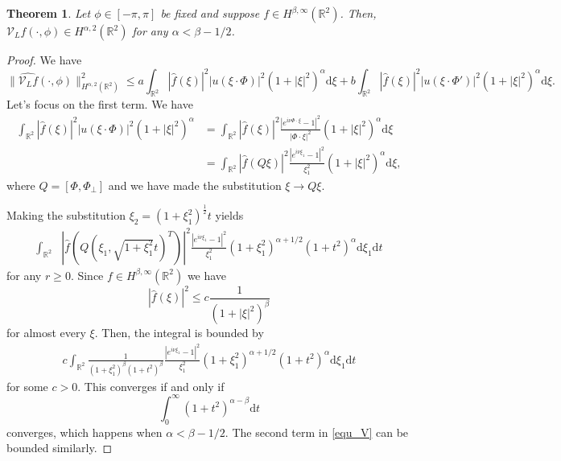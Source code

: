 \documentclass[a4paper,12pt]{amsart}
\numberwithin{equation}{section}
\theoremstyle{plain}
\newtheorem{theorem}{Theorem}
\numberwithin{theorem}{section}
\theoremstyle{definition}
\theoremstyle{remark}
\theoremstyle{remark}
\theoremstyle{remark}
\newcommand{\seanc}[1]{\begin{quotation}\textbf{Sean's comment:\
}{\textit{#1}}\end{quotation}}
\begin{document}
\begin{theorem}
\label{V_smooth}
Let $\phi \in [-\pi,\pi]$ be fixed and suppose $f\in H^{\beta,\infty}(\mathbb{R}^2)$. Then, $\mathcal{V}_L f (\cdot,\phi) \in H^{\alpha,2}(\mathbb{R}^2)$ for any $\alpha < \beta - 1/2$.
\end{theorem}
\begin{proof}
We have
\begin{equation}
\label{equ_V}
\|\widehat{\mathcal{V}_L f}(\cdot,\phi)\|^2_{H^{\alpha,2}(\mathbb{R}^2)} \leq a\int_{\mathbb{R}^2}|\hat{f}(\xi)|^2|u(\xi\cdot\Phi)|^2(1+|\xi|^2)^\alpha\mathrm{d}\xi+ b\int_{\mathbb{R}^2}|\hat{f}(\xi)|^2|u(\xi\cdot\Phi')|^2(1+|\xi|^2)^\alpha\mathrm{d}\xi.
\end{equation}
Let's focus on the first term. We have
\begin{equation}
\begin{split}
\int_{\mathbb{R}^2}|\hat{f}(\xi)|^2|u(\xi\cdot\Phi)|^2(1+|\xi|^2)^\alpha &= \int_{\mathbb{R}^2}|\hat{f}(\xi)|^2\frac{|e^{i\nu \Phi \cdot \xi} - 1|^2}{|\Phi \cdot \xi|^2} (1+|\xi|^2)^\alpha \mathrm{d}\xi\\
& = \int_{\mathbb{R}^2}|\hat{f}(Q\xi)|^2\frac{|e^{i\nu \xi_1} - 1|^2}{\xi_1^2} (1+|\xi|^2)^\alpha\mathrm{d}\xi,
\end{split}
\end{equation}
where $Q = [\Phi,\Phi_\perp]$ and we have made the substitution $\xi \to Q \xi$. 

Making the substitution $\xi_2 = (1 + \xi_1^2)^{\frac{1}{2}}t$ yields
\begin{equation}
\begin{split}
\int_{\mathbb{R}^2}&|\hat{f}(Q(\xi_1,\sqrt{1+\xi_1^2}t)^T)|^2\frac{|e^{i\nu \xi_1} - 1|^2}{\xi_1^2}(1+\xi_1^2)^{\alpha+1/2}(1+t^2)^\alpha\mathrm{d}\xi_1 \mathrm{d}t%
\end{split}
\end{equation}
for any $r\geq 0$. Since $f\in H^{\beta,\infty}(\mathbb{R}^2)$ we have
$$|\hat{f}(\xi)|^2\leq c\frac{1}{(1+|\xi|^2)^\beta}$$
for almost every $\xi$. Then, the integral is bounded by
\begin{equation}
\begin{split}
c\int_{\mathbb{R}^2}\frac{1}{(1+\xi_1^2)^\beta(1+t^2)^\beta}\frac{|e^{i\nu \xi_1} - 1|^2}{\xi_1^2}(1+\xi_1^2)^{\alpha+1/2}(1+t^2)^\alpha\mathrm{d}\xi_1 \mathrm{d}t
\end{split}
\end{equation}
for some $c>0$. This converges if and only if
$$\int_0^\infty(1+t^2)^{\alpha - \beta}\mathrm{d}t$$
converges, which happens when $\alpha < \beta - 1/2$. The second term in \eqref{equ_V} can be bounded similarly.
\end{proof}
\end{document}
